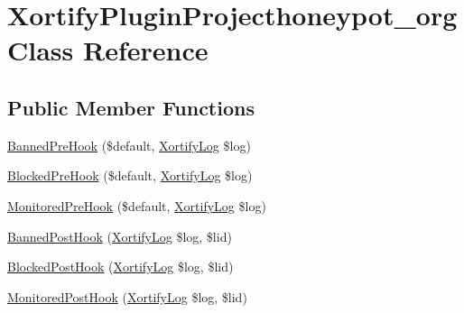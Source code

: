 \hypertarget{class_xortify_plugin_projecthoneypot__org}{\section{Xortify\-Plugin\-Projecthoneypot\-\_\-org Class Reference}
\label{class_xortify_plugin_projecthoneypot__org}
}
\subsection*{Public Member Functions}
\begin{DoxyCompactItemize}
\item 
\hyperlink{class_xortify_plugin_projecthoneypot__org_aacd0a27d3740aae83c03e921f6e58783}{Banned\-Pre\-Hook} (\$default, \hyperlink{class_xortify_log}{Xortify\-Log} \$log)
\item 
\hyperlink{class_xortify_plugin_projecthoneypot__org_a1b0001df5cf5ef18a5181774ce16b089}{Blocked\-Pre\-Hook} (\$default, \hyperlink{class_xortify_log}{Xortify\-Log} \$log)
\item 
\hyperlink{class_xortify_plugin_projecthoneypot__org_abbd4e782a10042ec86d3bef94daad89a}{Monitored\-Pre\-Hook} (\$default, \hyperlink{class_xortify_log}{Xortify\-Log} \$log)
\item 
\hyperlink{class_xortify_plugin_projecthoneypot__org_a6bc03033f17c2fcede4d020d1cfbcc48}{Banned\-Post\-Hook} (\hyperlink{class_xortify_log}{Xortify\-Log} \$log, \$lid)
\item 
\hyperlink{class_xortify_plugin_projecthoneypot__org_a1cb2408e6422326482b2e8eb45d2d0c1}{Blocked\-Post\-Hook} (\hyperlink{class_xortify_log}{Xortify\-Log} \$log, \$lid)
\item 
\hyperlink{class_xortify_plugin_projecthoneypot__org_aa4a3d909c3769e0c3c7b6488f8659a1d}{Monitored\-Post\-Hook} (\hyperlink{class_xortify_log}{Xortify\-Log} \$log, \$lid)
\end{DoxyCompactItemize}


